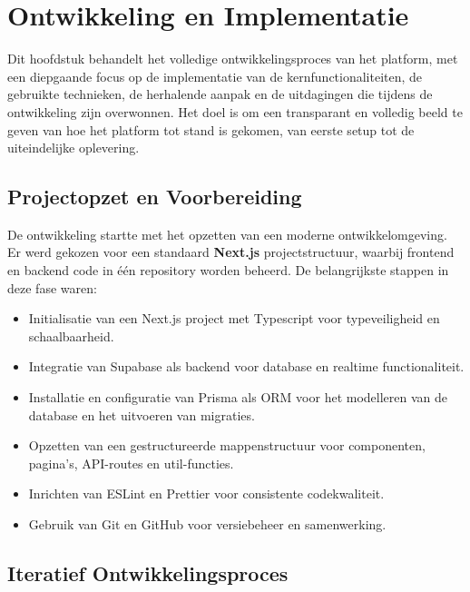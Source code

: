 \chapter{Ontwikkeling en Implementatie}
\label{ch:ontwikkeling}

Dit hoofdstuk behandelt het volledige ontwikkelingsproces van het platform, met een diepgaande focus op de implementatie van de kernfunctionaliteiten, de gebruikte technieken, de herhalende aanpak en de uitdagingen die tijdens de ontwikkeling zijn overwonnen. Het doel is om een transparant en volledig beeld te geven van hoe het platform tot stand is gekomen, van eerste setup tot de uiteindelijke oplevering.

\section{Projectopzet en Voorbereiding}
\label{sec:projectopzet}

De ontwikkeling startte met het opzetten van een moderne ontwikkelomgeving. Er werd gekozen voor een standaard \textbf{Next.js} projectstructuur, waarbij frontend en backend code in één repository worden beheerd. De belangrijkste stappen in deze fase waren:
\begin{itemize}
    \item Initialisatie van een Next.js project met Typescript voor typeveiligheid en schaalbaarheid.
    \item Integratie van Supabase als backend voor database en realtime functionaliteit.
    \item Installatie en configuratie van Prisma als ORM voor het modelleren van de database en het uitvoeren van migraties.
    \item Opzetten van een gestructureerde mappenstructuur voor componenten, pagina's, API-routes en util-functies.
    \item Inrichten van ESLint en Prettier voor consistente codekwaliteit.
    \item Gebruik van Git en GitHub voor versiebeheer en samenwerking.
\end{itemize}

\section{Iteratief Ontwikkelingsproces}
\label{sec:iteratief-proces}

